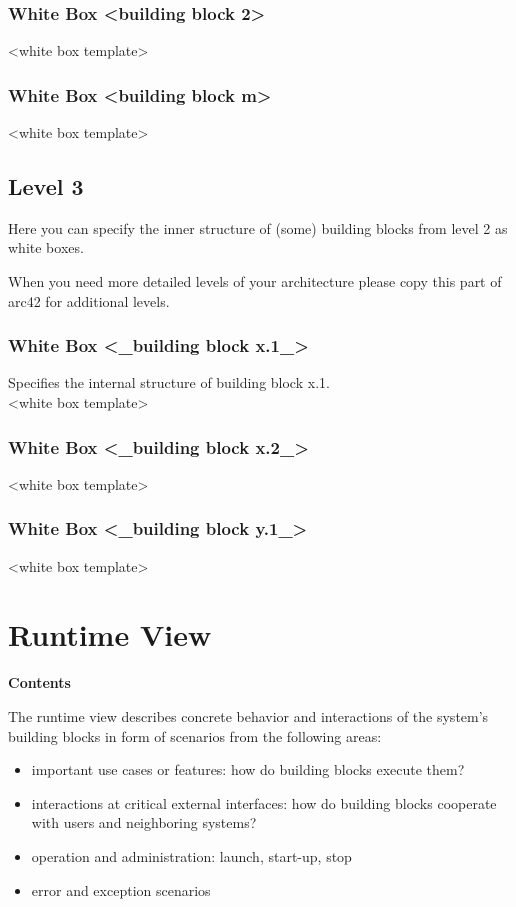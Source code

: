 \documentclass[12pt,a4paper]{article}
\newcommand{\minititle}[1]{%
  \par\addvspace{0.6\baselineskip}%
  \noindent\textbf{#1}\par\nobreak%
  \noindent\ignorespaces%
}
\begin{document}
\subsubsection{White Box \textless building block 2\textgreater}
\textless white box template\textgreater

\subsubsection{White Box \textless building block m\textgreater}
\textless white box template\textgreater

\subsection{Level 3}

Here you can specify the inner structure of (some) building blocks from level 2 as white boxes.

When you need more detailed levels of your architecture please copy this part of arc42 for additional levels.

\subsubsection{White Box \textless\_building block x.1\_\textgreater}
Specifies the internal structure of building block x.1.\\
\textless white box template\textgreater

\subsubsection{White Box \textless\_building block x.2\_\textgreater}
\textless white box template\textgreater

\subsubsection{White Box \textless\_building block y.1\_\textgreater}
\textless white box template\textgreater

\section{Runtime View}

\minititle{Contents}
The runtime view describes concrete behavior and interactions of the system’s building blocks in form of scenarios from the following areas:
\begin{itemize}
  \item important use cases or features: how do building blocks execute them?
  \item interactions at critical external interfaces: how do building blocks cooperate with users and neighboring systems?
  \item operation and administration: launch, start-up, stop
  \item error and exception scenarios
\end{itemize}
\end{document}
